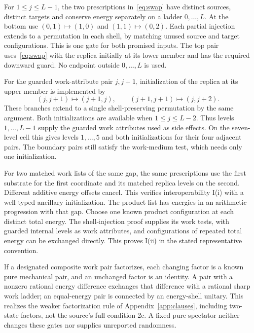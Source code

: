 For $1\le j\le L-1$, the two prescriptions in~\eqref{eq:swap} have distinct sources, distinct targets and conserve energy separately on a ladder $0,\ldots,L$. At the bottom use $(0,1)\mapsto(1,0)$ and $(1,1)\mapsto(0,2)$. Each partial injection extends to a permutation in each shell, by matching unused source and target configurations. This is one gate for both promised inputs. The top pair uses~\eqref{eq:swap} with the replica initially at its lower member and has the required downward guard. No endpoint outside $0,\ldots,L$ is used.

For the guarded work-attribute pair $j,j+1$, initialization of the replica at its upper member is implemented by
\[
 (j,j+1)\mapsto(j+1,j),\qquad
 (j+1,j+1)\mapsto(j,j+2).
\]
These branches extend to a single shell-preserving permutation by the same argument. Both initializations are available when $1\le j\le L-2$. Thus levels $1,\ldots,L-1$ supply the guarded work attributes used as side effects. On the seven-level cell this gives levels $1,\ldots,5$ and both initializations for their four adjacent pairs. The boundary pairs still satisfy the work-medium test, which needs only one initialization.

For two matched work lists of the same gap, the same prescriptions use the first substrate for the first coordinate and its matched replica levels on the second. Different additive energy offsets cancel. This verifies interoperability I(i) with a well-typed ancillary initialization. The product list has energies in an arithmetic progression with that gap. Choose one known product configuration at each distinct total energy. The shell-injection proof supplies its work tests, with guarded internal levels as work attributes, and configurations of repeated total energy can be exchanged directly. This proves I(ii) in the stated representative convention.

If a designated composite work pair factorizes, each changing factor is a known pure mechanical pair, and an unchanged factor is an identity. A pair with a nonzero rational energy difference exchanges that difference with a rational sharp work ladder; an equal-energy pair is connected by an energy-shell unitary. This realizes the weaker factorization rule of Appendix~\ref{app:clauses}, including two-state factors, not the source's full condition 2c. A fixed pure spectator neither changes these gates nor supplies unreported randomness.

